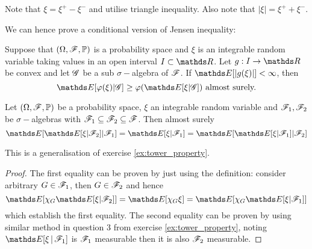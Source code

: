 \begin{hint}
Note that $\xi = \xi^+ - \xi^-$ and utilise triangle inequality. Also note that $|\xi| = \xi^+ + \xi^-$.
\end{hint}

We can hence prove a conditional version of Jensen inequality:
\begin{theorem}
Suppose that $(\Omega, \mathcal{F},\mathbb{P})$ is a probability space and $\xi$ is an integrable random variable taking values in an open interval $I \subset \R$. Let $g: I \to \R$ be convex and let $\mathcal{G}$ be a sub $\sigma-$algebra of $\mathcal{F}$. If $\E[|g(\xi)|] < \infty$, then
\begin{equation} \label{eq:conditional_Jensen_ineq}
    \E[\varphi(\xi) | \G] \ge \varphi(\E[\xi | \G])  \text{ almost surely.}
\end{equation}
\end{theorem}

\begin{property}
Let $(\Omega, \mathcal{F},\mathbb{P})$ be a probability space, $\xi$ an integrable random variable and $\mathcal{F}_1, \mathcal{F}_2$ be $\sigma-$algebras with $\mathcal{F}_1 \subseteq \mathcal{F}_2 \subseteq \mathcal{F}$. Then almost surely
\begin{equation}
\E[\E[\xi | \F_2] | \F_1] = \E[\xi | \F_1] = \E[\E[\xi | \F_1] | \F_2]
\end{equation}
\end{property}

\begin{hint}
This is a generalisation of exercise \ref{ex:tower_property}.
\end{hint}

\begin{proof}
The first equality can be proven by just using the definition: consider arbitrary $G \in \mathcal{F}_1$, then $G \in \mathcal{F}_2$ and hence 
\begin{equation}
    \E[\chi_G \E[\xi | \F_2]] = \E[\chi_G \xi] = \E[\chi_G \E[\xi | \F_1]]
\end{equation}
which establish the first equality. The second equality can be proven by using similar method in  question 3 from exercise \ref{ex:tower_property}, noting $\E[\xi\,|\,\F_1]$ is $\mathcal{F}_1$ measurable then it is also $\mathcal{F}_2$ measurable.
\end{proof}

